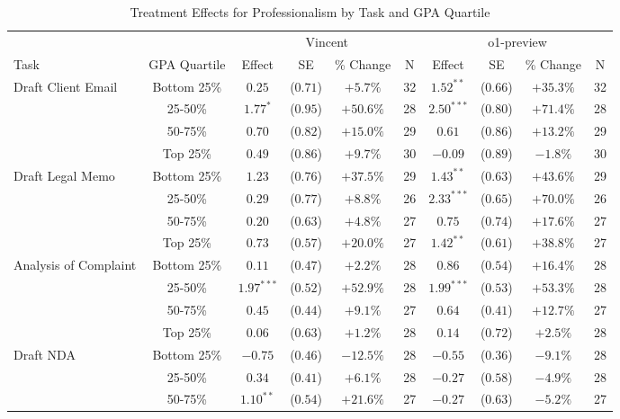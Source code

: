 \begin{table}[!htbp]
\centering
\caption{Treatment Effects for Professionalism by Task and GPA Quartile}
\label{tab:professionalism_gpa}
\begin{tabular}{lccccccccc}
\hline\hline
& & \multicolumn{4}{c}{Vincent} & \multicolumn{4}{c}{o1-preview} \\
\cline{3-10}
Task & GPA Quartile & Effect & SE & \% Change & N & Effect & SE & \% Change & N \\
\hline
\multirow{4}{*}{Draft Client Email} & Bottom 25\% & $0.25$ & ($0.71$) & $+5.7\%$ & 32 & $1.52^{**}$ & ($0.66$) & $+35.3\%$ & 32 \\
& 25-50\% & $1.77^{*}$ & ($0.95$) & $+50.6\%$ & 28 & $2.50^{***}$ & ($0.80$) & $+71.4\%$ & 28 \\
& 50-75\% & $0.70$ & ($0.82$) & $+15.0\%$ & 29 & $0.61$ & ($0.86$) & $+13.2\%$ & 29 \\
& Top 25\% & $0.49$ & ($0.86$) & $+9.7\%$ & 30 & $-0.09$ & ($0.89$) & $-1.8\%$ & 30 \\
\hline
\multirow{4}{*}{Draft Legal Memo} & Bottom 25\% & $1.23$ & ($0.76$) & $+37.5\%$ & 29 & $1.43^{**}$ & ($0.63$) & $+43.6\%$ & 29 \\
& 25-50\% & $0.29$ & ($0.77$) & $+8.8\%$ & 26 & $2.33^{***}$ & ($0.65$) & $+70.0\%$ & 26 \\
& 50-75\% & $0.20$ & ($0.63$) & $+4.8\%$ & 27 & $0.75$ & ($0.74$) & $+17.6\%$ & 27 \\
& Top 25\% & $0.73$ & ($0.57$) & $+20.0\%$ & 27 & $1.42^{**}$ & ($0.61$) & $+38.8\%$ & 27 \\
\hline
\multirow{4}{*}{Analysis of Complaint} & Bottom 25\% & $0.11$ & ($0.47$) & $+2.2\%$ & 28 & $0.86$ & ($0.54$) & $+16.4\%$ & 28 \\
& 25-50\% & $1.97^{***}$ & ($0.52$) & $+52.9\%$ & 28 & $1.99^{***}$ & ($0.53$) & $+53.3\%$ & 28 \\
& 50-75\% & $0.45$ & ($0.44$) & $+9.1\%$ & 27 & $0.64$ & ($0.41$) & $+12.7\%$ & 27 \\
& Top 25\% & $0.06$ & ($0.63$) & $+1.2\%$ & 28 & $0.14$ & ($0.72$) & $+2.5\%$ & 28 \\
\hline
\multirow{4}{*}{Draft NDA} & Bottom 25\% & $-0.75$ & ($0.46$) & $-12.5\%$ & 28 & $-0.55$ & ($0.36$) & $-9.1\%$ & 28 \\
& 25-50\% & $0.34$ & ($0.41$) & $+6.1\%$ & 28 & $-0.27$ & ($0.58$) & $-4.9\%$ & 28 \\
& 50-75\% & $1.10^{**}$ & ($0.54$) & $+21.6\%$ & 27 & $-0.27$ & ($0.63$) & $-5.2\%$ & 27 \\

\end{tabular}
\end{table}
